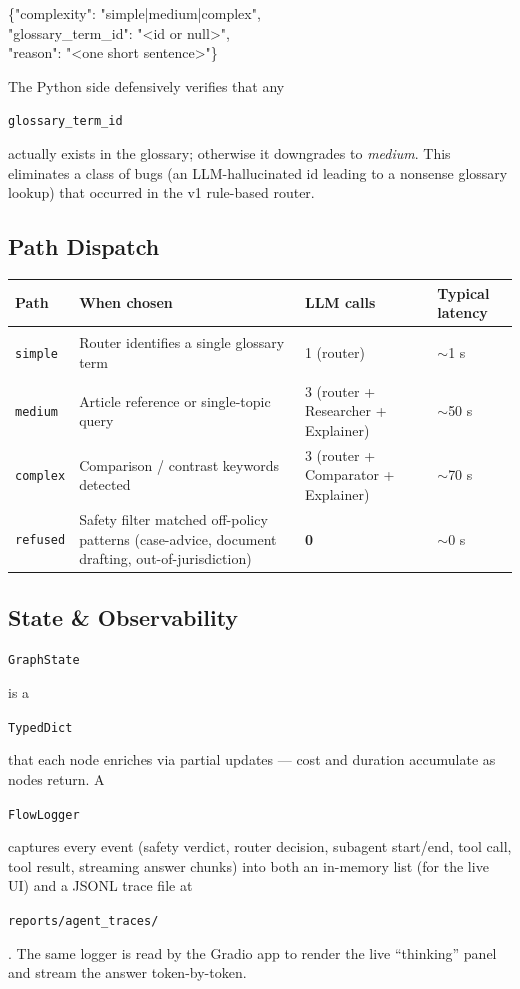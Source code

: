 \documentclass[10pt,a4paper]{article}
\newcommand{\code}[1]{\colorbox{boxbg}{\strut\texttt{\small #1}}}
\begin{document}
\smallskip
\colorbox{boxbg}{\parbox{0.96\linewidth}{\small\ttfamily
\{"complexity": "simple|medium|complex",\\
\hphantom{X}"glossary\_term\_id": "<id or null>",\\
\hphantom{X}"reason": "<one short sentence>"\}
}}

\smallskip
\noindent The Python side defensively verifies that any \code{glossary\_term\_id} actually exists in the glossary; otherwise it downgrades to \emph{medium}. This eliminates a class of bugs (an LLM-hallucinated id leading to a nonsense glossary lookup) that occurred in the v1 rule-based router.

\subsection{Path Dispatch}
\begin{tabularx}{\linewidth}{l X l l}
\toprule
\textbf{Path} & \textbf{When chosen} & \textbf{LLM calls} & \textbf{Typical latency} \\
\midrule
\rowcolor{rowblue}
\code{simple} & Router identifies a single glossary term & 1 (router) & $\sim$1 s \\
\code{medium} & Article reference or single-topic query & 3 (router + Researcher + Explainer) & $\sim$50 s \\
\rowcolor{rowblue}
\code{complex} & Comparison / contrast keywords detected & 3 (router + Comparator + Explainer) & $\sim$70 s \\
\code{refused} & Safety filter matched off-policy patterns (case-advice, document drafting, out-of-jurisdiction) & \textbf{0} & $\sim$0 s \\
\bottomrule
\end{tabularx}

\subsection{State \& Observability}
\code{GraphState} is a \code{TypedDict} that each node enriches via partial updates — cost and duration accumulate as nodes return. A \code{FlowLogger} captures every event (safety verdict, router decision, subagent start/end, tool call, tool result, streaming answer chunks) into both an in-memory list (for the live UI) and a JSONL trace file at \code{reports/agent\_traces/}. The same logger is read by the Gradio app to render the live ``thinking'' panel and stream the answer token-by-token.

\end{document}
